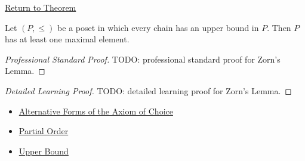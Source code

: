 \newpage
{}
\label{prf:zorn}

\begin{remark*}[Return]
\hyperref[thm:zorn]{Return to Theorem}
\end{remark*}

\begin{theorem*}
Let $(P, \leq)$ be a poset in which every chain has an upper bound in $P$.
Then $P$ has at least one maximal element.
\end{theorem*}

\begin{proof}[Professional Standard Proof]
\LRAProofBodyStart
TODO: professional standard proof for Zorn's Lemma.
\end{proof}

\begin{proof}[Detailed Learning Proof]
\LRAProofBodyStart
TODO: detailed learning proof for Zorn's Lemma.
\end{proof}

\begin{remark*}
\end{remark*}

\begin{dependencies}
\begin{itemize}
  \item \hyperref[thm:ac-alternative-forms]{Alternative Forms of the Axiom of Choice}
  \item \hyperref[def:partial-order]{Partial Order}
  \item \hyperref[def:upper-bound]{Upper Bound}
\end{itemize}
\end{dependencies}

\clearpage
